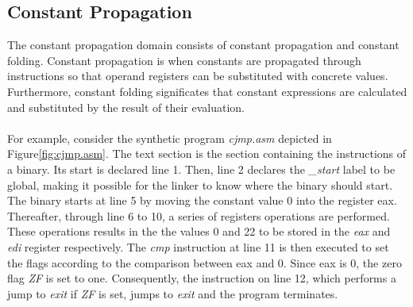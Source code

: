 \documentclass{kththesis}
\newcommand{\fbcomment}[1]{{#1}}
\renewcommand{\fbcomment}[1]{}
\renewcommand{\it}[1]{\textit{#1}}
\begin{document}
\subsection{Constant Propagation}\label{sec:absDomCon}
\fbcomment{\color{red}Goal: Introduce constant propagation and show a basic example of how it is used.}
The constant propagation domain consists of constant propagation and constant folding. Constant propagation is when constants are propagated through instructions so that operand registers can be substituted with concrete values. Furthermore, constant folding significates that constant expressions are calculated and substituted by the result of their evaluation.
\\ \\
For example, consider the synthetic program \it{cjmp.asm} depicted in Figure\ref{fig:cjmp.asm}. The text section is the section containing the instructions of a binary. Its start is declared line 1. Then, line 2 declares the \it{\_start} label to be global, making it possible for the linker to know where the binary should start. The binary starts at line 5 by moving the constant value 0 into the register eax. Thereafter, through line 6 to 10, a series of registers operations are performed. These operations results in the the values 0 and 22 to be stored in the \it{eax} and \it{edi} register respectively. The \it{cmp} instruction at line 11 is then executed to set the flags according to the comparison between eax and 0. Since eax is 0, the zero flag \it{ZF} is set to one. Consequently, the instruction on line 12, which performs a jump to \it{exit} if \it{ZF} is set, jumps to \it{exit} and the program terminates. 
\end{document}
